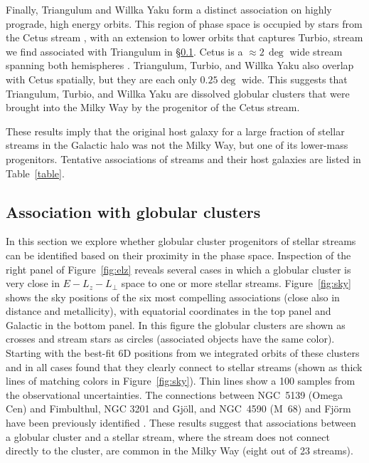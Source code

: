 \documentclass[twocolumn]{aastex63}
\begin{document}
Finally, Triangulum and Willka Yaku form a distinct association on highly prograde, high energy orbits.
This region of phase space is occupied by stars from the Cetus stream \citep{yuan2019}, with an extension to lower orbits that captures Turbio, stream we find associated with Triangulum in \S\ref{sec:progenitors}.
Cetus is a $\approx2\,\deg$ wide stream spanning both hemispheres \citep[the southern portion of the stream was identified as the Palca overdensity]{newberg2009, chang2020}.
Triangulum, Turbio, and Willka Yaku also overlap with Cetus spatially, but they are each only $0.25\deg$ wide.
This suggests that Triangulum, Turbio, and Willka Yaku are dissolved globular clusters that were brought into the Milky Way by the progenitor of the Cetus stream.

These results imply that the original host galaxy for a large fraction of stellar streams in the Galactic halo was not the Milky Way, but one of its lower-mass progenitors.
Tentative associations of streams and their host galaxies are listed in Table~\ref{table}.


\subsection{Association with globular clusters}
\label{sec:progenitors}
In this section we explore whether globular cluster progenitors of stellar streams can be identified based on their proximity in the phase space.
Inspection of the right panel of Figure~\ref{fig:elz} reveals several cases in which a globular cluster is very close in $E-L_z-L_\perp$ space to one or more stellar streams.
Figure~\ref{fig:sky} shows the sky positions of the six most compelling associations (close also in distance and metallicity), with equatorial coordinates in the top panel and Galactic in the bottom panel.
In this figure the globular clusters are shown as crosses and stream stars as circles (associated objects have the same color).
Starting with the best-fit 6D positions from \citet{baumgardt2019} we integrated orbits of these clusters and in all cases found that they clearly connect to stellar streams (shown as thick lines of matching colors in Figure~\ref{fig:sky}).
Thin lines show a 100 samples from the observational uncertainties.
The connections between NGC~5139 (Omega Cen) and Fimbulthul, NGC 3201 and Gj\" oll, and NGC~4590 (M~68) and Fj\" orm have been previously identified \citep[and references therein]{ibata2021}.
These results suggest that associations between a globular cluster and a stellar stream, where the stream does not connect directly to the cluster, are common in the Milky Way (eight out of 23 streams).
\end{document}
